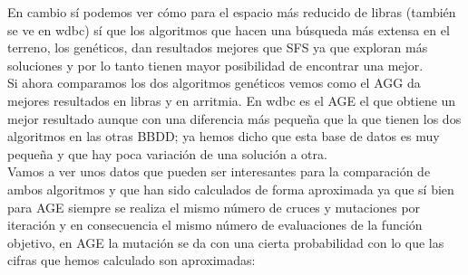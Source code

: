 \documentclass[10pt,a4paper]{article}
\begin{document}
En cambio sí podemos ver cómo para el espacio más reducido de libras (también se ve en wdbc) sí que los algoritmos que hacen una búsqueda más extensa en el terreno, los genéticos, dan resultados mejores que SFS ya que exploran más soluciones y por lo tanto tienen mayor posibilidad de encontrar una mejor.\\

Si ahora comparamos los dos algoritmos genéticos vemos como el AGG da mejores resultados en libras y en arritmia. En wdbc es el AGE el que obtiene un mejor resultado aunque con una diferencia más pequeña que la que tienen los dos algoritmos en las otras BBDD; ya hemos dicho que esta base de datos es muy pequeña y que hay poca variación de una solución a otra.\\

Vamos a ver unos datos que pueden ser interesantes para la comparación de ambos algoritmos y que han sido calculados de forma aproximada ya que sí bien para AGE siempre se realiza el mismo número de cruces y mutaciones por iteración y en consecuencia el mismo número de evaluaciones de la función objetivo, en AGE la mutación se da con una cierta probabilidad con lo que las cifras que hemos calculado son aproximadas:\\

\begin{table}[H]
\centering
\caption{Datos algoritmos genéticos}
\label{my-label}
\end{table}
\end{document}
